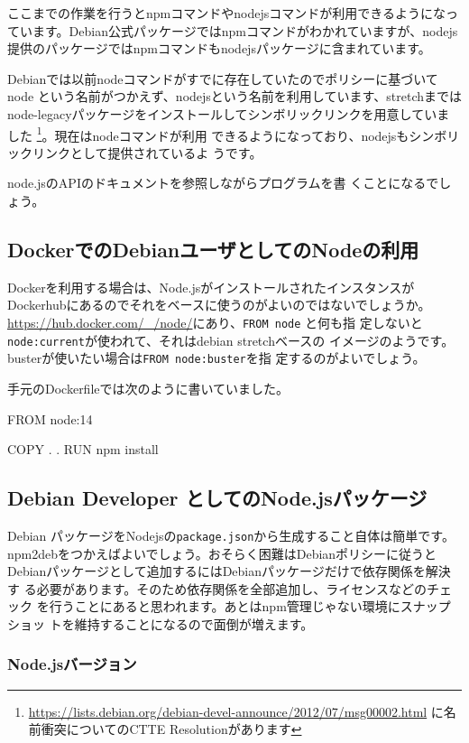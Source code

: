 \documentclass[mingoth,a4paper]{jsarticle}
\begin{document}
ここまでの作業を行うとnpmコマンドやnodejsコマンドが利用できるようになっ
ています。Debian公式パッケージではnpmコマンドがわかれていますが、nodejs
提供のパッケージではnpmコマンドもnodejsパッケージに含まれています。

Debianでは以前nodeコマンドがすでに存在していたのでポリシーに基づいてnode
という名前がつかえず、nodejsという名前を利用しています、stretchまでは
node-legacyパッケージをインストールしてシンボリックリンクを用意していま
した
\footnote{\url{https://lists.debian.org/debian-devel-announce/2012/07/msg00002.html}
に名前衝突についてのCTTE Resolutionがあります}。現在はnodeコマンドが利用
できるようになっており、nodejsもシンボリックリンクとして提供されているよ
うです。

node.jsのAPIのドキュメント\cite{nodejs-api}を参照しながらプログラムを書
くことになるでしょう。

\subsection{DockerでのDebianユーザとしてのNodeの利用}

Dockerを利用する場合は、Node.jsがインストールされたインスタンスが
Dockerhubにあるのでそれをベースに使うのがよいのではないでしょうか。
\url{https://hub.docker.com/_/node/}にあり、\texttt{FROM node} と何も指
定しないと\texttt{node:current}が使われて、それはdebian stretchベースの
イメージのようです。busterが使いたい場合は\texttt{FROM node:buster}を指
定するのがよいでしょう。

手元のDockerfileでは次のように書いていました。

\begin{commandline}
FROM node:14

COPY . .
RUN npm install
\end{commandline}

\subsection{Debian Developer としてのNode.jsパッケージ}

Debian パッケージをNodejsの\texttt{package.json}から生成すること自体は簡単です。
npm2debをつかえばよいでしょう。おそらく困難はDebianポリシーに従うと
Debianパッケージとして追加するにはDebianパッケージだけで依存関係を解決す
る必要があります。そのため依存関係を全部追加し、ライセンスなどのチェック
を行うことにあると思われます。あとはnpm管理じゃない環境にスナップショッ
トを維持することになるので面倒が増えます。

\subsubsection{Node.jsバージョン}
\end{document}
